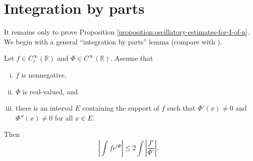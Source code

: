 \documentclass[reqno]{amsart} 
\begin{document}
\section{Integration by parts}\label{sec:integration-parts}
It remains only to prove Proposition \ref{proposition:oscillatory-estimates-for-I-of-n}.  We begin with a general ``integration by parts''  lemma (compare with \cite[Lemma 8.9]{MR2061214}).
\begin{lemma}\label{lemma:integration-by-parts}
  Let $f \in C_c^\infty(\mathbb{R})$ and $\Phi \in C^\infty(\mathbb{R})$.  Assume that
  \begin{enumerate}[(i)]
  \item $f$ is nonnegative, 
  \item $\Phi$ is real-valued, and
  \item there is an interval $E$ containing the support of $f$ such that $\Phi '(x) \neq 0$ and $\Phi ''(x) \neq 0$ for all $x \in E$.
  \end{enumerate}
  Then
  \begin{equation*}
    \left\lvert \int f e ^{i\Phi } \right\rvert \leq 2 \int \left\lvert \frac{f'}{ \Phi '} \right\rvert.
  \end{equation*}
\end{lemma}
\end{document}
